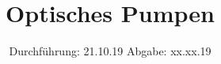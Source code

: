 

\subject{V21}
\title{Optisches Pumpen}
\date{
  Durchführung: 21.10.19
  \hspace{3em}
  Abgabe: xx.xx.19
}



\maketitle
\thispagestyle{empty}
\tableofcontents
\newpage




%



\newpage
\printbibliography


